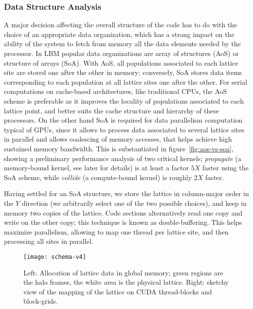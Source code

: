 \documentclass{elsarticle}
\begin{document}
\subsubsection*{Data Structure Analysis}

A major decision affecting the overall structure of the code has to 
do with the choice of an appropriate data organization, which has a strong 
impact on the ability of the system to fetch from memory all the data 
elements needed by the processor. In LBM popular data organizations are 
array of structures (AoS) or structure of arrays (SoA).
%
With AoS, all populations associated to each 
lattice site are stored one after the other in memory; conversely, SoA 
stores data items corresponding to each population at all lattice sites
one after the other. 
%
For serial computations on cache-based architectures, like traditional CPUs, 
the AoS scheme is preferable as it improves the locality of populations 
associated to each lattice point, and better suits the cache structure 
and hierarchy of these processors. 
%
On the other hand SoA is required for data parallelism computation 
typical of GPUs, since it allows to process data associated to several 
lattice sites in parallel and allows coalescing of memory accesses, that 
helps achieve high sustained memory bandwidth.
% 
This is substantiated in figure~\ref{fig:aos-vs-soa}, showing a preliminary
performance analysis of two critical kernels;
{\em propagate} (a memory-bound kernel, see later for details) 
is at least a factor $5X$ faster using the SoA scheme, while {\em collide} 
(a compute-bound kernel) is roughly $2X$ faster.

Having settled for an SoA structure, we store the lattice in column-major 
order in the $Y$ direction (we arbitrarily select one of the two possible choices), 
and keep in memory two copies of the lattice. 
%
Code sections alternatively read one copy and write on the other copy; 
this technique is known as double-buffering.
%
This helps maximize parallelism, allowing to map one thread per lattice site, 
and then processing all sites in parallel.

%
\begin{figure}[t]
\centering
\texttt{[image: schema-v4]}
%
\caption{Left: Allocation of lattice data in global memory; green regions
are the halo frames, the white area is the physical 
lattice. Right: sketchy view of the mapping of the lattice on 
CUDA thread-blocks and block-grids.}
\label{fig:cudagrids}
\end{figure}
%
\end{document}

